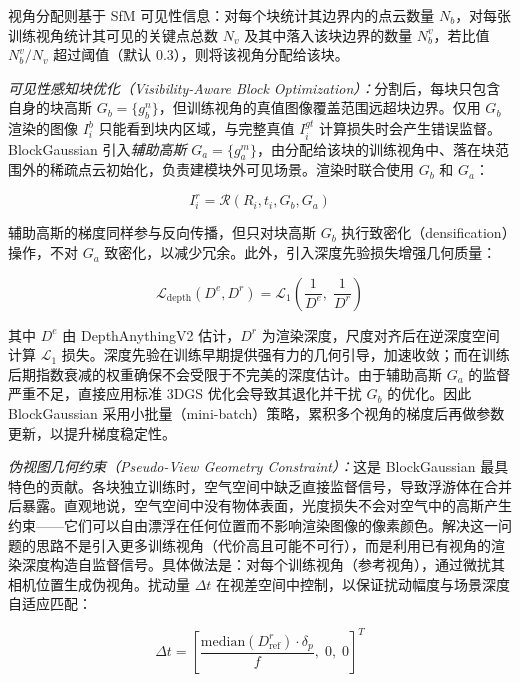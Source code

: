 视角分配则基于 SfM 可见性信息：对每个块统计其边界内的点云数量 $N_b$，对每张训练视角统计其可见的关键点总数 $N_v$ 及其中落入该块边界的数量 $N_b^v$，若比值 $N_b^v / N_v$ 超过阈值（默认 0.3），则将该视角分配给该块。

\emph{可见性感知块优化（Visibility-Aware Block Optimization）：}分割后，每块只包含自身的块高斯 $G_b = \{g_b^n\}$，但训练视角的真值图像覆盖范围远超块边界。仅用 $G_b$ 渲染的图像 $I_i^b$ 只能看到块内区域，与完整真值 $I_i^{gt}$ 计算损失时会产生错误监督。BlockGaussian 引入\emph{辅助高斯} $G_a = \{g_a^m\}$，由分配给该块的训练视角中、落在块范围外的稀疏点云初始化，负责建模块外可见场景。渲染时联合使用 $G_b$ 和 $G_a$：

\begin{equation}
I_i^r = \mathcal{R}(R_i, t_i, G_b, G_a)
\end{equation}

辅助高斯的梯度同样参与反向传播，但只对块高斯 $G_b$ 执行致密化（densification）操作，不对 $G_a$ 致密化，以减少冗余。此外，引入深度先验损失增强几何质量：

\begin{equation}
\mathcal{L}_{\text{depth}}(D^{e}, D^r) = \mathcal{L}_1\!\left(\frac{1}{D^{e}},\; \frac{1}{D^r}\right)
\end{equation}

其中 $D^{e}$ 由 DepthAnythingV2 估计，$D^r$ 为渲染深度，尺度对齐后在逆深度空间计算 $\mathcal{L}_1$ 损失。深度先验在训练早期提供强有力的几何引导，加速收敛；而在训练后期指数衰减的权重确保不会受限于不完美的深度估计。由于辅助高斯 $G_a$ 的监督严重不足，直接应用标准 3DGS 优化会导致其退化并干扰 $G_b$ 的优化。因此 BlockGaussian 采用小批量（mini-batch）策略，累积多个视角的梯度后再做参数更新，以提升梯度稳定性。

\emph{伪视图几何约束（Pseudo-View Geometry Constraint）：}这是 BlockGaussian 最具特色的贡献。各块独立训练时，空气空间中缺乏直接监督信号，导致浮游体在合并后暴露。直观地说，空气空间中没有物体表面，光度损失不会对空气中的高斯产生约束——它们可以自由漂浮在任何位置而不影响渲染图像的像素颜色。解决这一问题的思路不是引入更多训练视角（代价高且可能不可行），而是利用已有视角的渲染深度构造自监督信号。具体做法是：对每个训练视角（参考视角），通过微扰其相机位置生成伪视角。扰动量 $\Delta t$ 在视差空间中控制，以保证扰动幅度与场景深度自适应匹配：

\begin{equation}
\Delta t = \left[\frac{\text{median}(D_{\text{ref}}^r) \cdot \delta_p}{f},\; 0,\; 0\right]^T
\end{equation}

